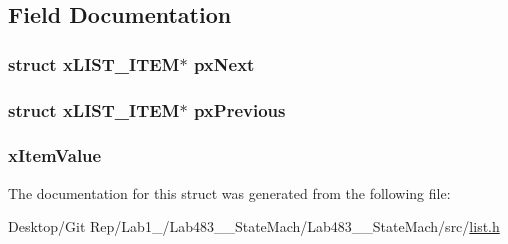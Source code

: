 \subsection{Field Documentation}
\hypertarget{structx_m_i_n_i___l_i_s_t___i_t_e_m_aa3188b77b81a666e2f670d1942c37d90}{
\subsubsection[{px\-Next}]{\setlength{\rightskip}{0pt plus 5cm}struct {\bf x\-L\-I\-S\-T\-\_\-\-I\-T\-E\-M}$\ast$ px\-Next}}\label{structx_m_i_n_i___l_i_s_t___i_t_e_m_aa3188b77b81a666e2f670d1942c37d90}
\hypertarget{structx_m_i_n_i___l_i_s_t___i_t_e_m_aeda19153a902efa73e3ee8662824d471}{
\subsubsection[{px\-Previous}]{\setlength{\rightskip}{0pt plus 5cm}struct {\bf x\-L\-I\-S\-T\-\_\-\-I\-T\-E\-M}$\ast$ px\-Previous}}\label{structx_m_i_n_i___l_i_s_t___i_t_e_m_aeda19153a902efa73e3ee8662824d471}
\hypertarget{structx_m_i_n_i___l_i_s_t___i_t_e_m_a83bf16246a7893527d5ea5d2aa7cc4bf}{
\subsubsection[{x\-Item\-Value}]{ x\-Item\-Value}}\label{structx_m_i_n_i___l_i_s_t___i_t_e_m_a83bf16246a7893527d5ea5d2aa7cc4bf}


The documentation for this struct was generated from the following file\-:\begin{DoxyCompactItemize}
\item 
Desktop/\-Git Rep/\-Lab1\-\_/\-Lab483\-\_\-\_\-\-State\-Mach/\-Lab483\-\_\-\_\-\-State\-Mach/src/\hyperlink{list_8h}{list.\-h}\end{DoxyCompactItemize}
